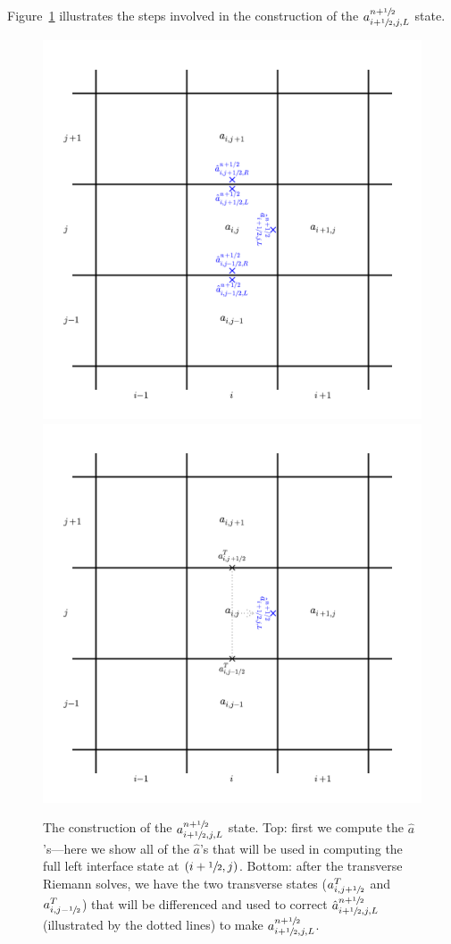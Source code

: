 Figure~\ref{fig:unsplitstates} illustrates the steps involved in
the construction of the $a_{i+\sfrac{1}{2},j,L}^{n+\sfrac{1}{2}}$ state.  
%
\begin{figure}
\centering
\includegraphics[width=0.7\linewidth]{2dgrid-hat} \\
\includegraphics[width=0.7\linewidth]{2dgrid-transverse}
\caption[The construction of an interface state with the transverse
  component]{\label{fig:unsplitstates} The construction of the
  $a_{i+\sfrac{1}{2},j,L}^{n+\sfrac{1}{2}}$ state.  Top: first we compute the
  $\hat{a}$'s---here we show all of the $\hat{a}$'s that will be used
  in computing the full left interface state at $(i+\sfrac{1}{2},j)$.  Bottom:
  after the transverse Riemann solves, we have the two transverse
  states ($a^T_{i,j+\sfrac{1}{2}}$ and $a^T_{i,j-\sfrac{1}{2}}$) that will be
  differenced and used to correct $\hat{a}_{i+\sfrac{1}{2},j,L}^{n+\sfrac{1}{2}}$
  (illustrated by the dotted lines) to make $a_{i+\sfrac{1}{2},j,L}^{n+\sfrac{1}{2}}$.}
\end{figure}

